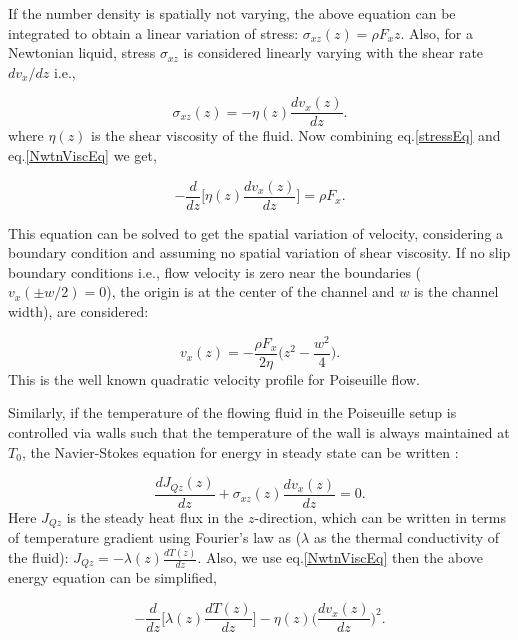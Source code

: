     If the number density is spatially not varying, the above equation can be integrated to obtain a linear variation of stress:
    $\sigma_{xz}(z) = \rho F_x z$. Also, for a Newtonian liquid, stress $\sigma_{xz}$ is considered linearly varying with the shear rate $dv_x/dz$ i.e.,

    \begin{equation}
    \sigma_{xz}(z) = -\eta(z) \frac{dv_x(z)}{dz}.
    \label{NwtnViscEq}
    \end{equation}
    where $\eta(z)$ is the shear viscosity of the fluid. Now combining eq.\ref{stressEq} and eq.\ref{NwtnViscEq} we get,

    \begin{equation}
    -\frac{d}{dz} \Big[ \eta(z) \frac{dv_x(z)}{dz}\Big] = \rho F_x.
    \end{equation}

    This equation can be solved \cite{travis1997departure,travis2000} to get the spatial variation of velocity, considering a boundary condition and assuming no spatial variation of shear viscosity. If no slip boundary conditions i.e., flow velocity is zero near the boundaries ($v_x(\pm w/2) = 0$), the origin is at the center of the channel and $w$ is the channel width), are considered:

    \begin{equation}
    v_x(z) = - \frac{\rho F_x}{2\eta} \Big( z^2 - \frac{w^2}{4}\Big).
    \end{equation}
    This is the well known quadratic velocity profile for Poiseuille flow.

    Similarly, if the temperature of the flowing fluid in the Poiseuille setup is controlled via walls such that the temperature of the wall is always maintained at $T_0$, the Navier-Stokes equation for energy in steady state can be written \cite{todd1997temperature}:

    \begin{equation}
    \frac{dJ_{Qz}(z)}{dz} + \sigma_{xz}(z) \frac{dv_x(z)}{dz} = 0.
    \end{equation}
    Here $J_{Qz}$ is the steady heat flux in the $z$-direction, which can be written in terms of temperature gradient using Fourier's law as ($\lambda$ as the thermal conductivity of the fluid): $J_{Qz} = -\lambda(z) \frac{dT(z)}{dz}$. Also, we use eq.\ref{NwtnViscEq} then the above energy equation can be simplified,

    \begin{equation}
    -\frac{d}{dz} \Bigg[ \lambda(z) \frac{dT(z)}{dz} \Bigg] - \eta(z) \Big( \frac{dv_x(z)}{dz} \Big)^2.
    \end{equation}

